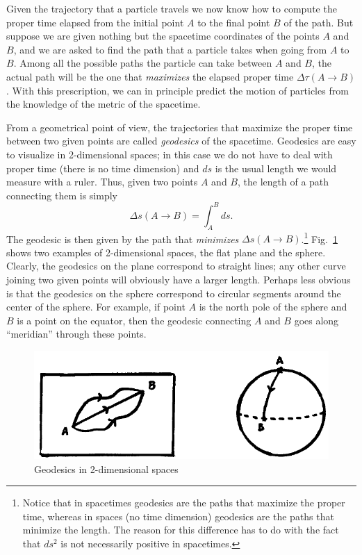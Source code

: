 Given the trajectory that a particle travels we now know how to compute the proper time elapsed from the initial point $A$ to the final point $B$ of the path. But suppose we are given nothing but the spacetime coordinates of the points $A$ and $B$, and we are asked to find the path that a particle takes when going from $A$ to $B$. Among all the possible paths the particle can take between $A$ and $B$, the actual path will be the one that {\it maximizes} the elapsed proper time $\Delta\tau(A\to B)$. With this prescription, we can in principle predict the motion of particles from the knowledge of the metric of the spacetime.

From a geometrical point of view, the trajectories that maximize the proper time between two given points are called {\it geodesics} of the spacetime. Geodesics are easy to visualize in 2-dimensional spaces; in this case we do not have to deal with proper time (there is no time dimension) and $ds$ is the usual length we would measure with a ruler. Thus, given two points $A$ and $B$, the length of a path connecting them is simply
\begin{equation}
\Delta s(A\to B)=\int_A^B ds.
\end{equation}
The geodesic is then given by the path that {\it minimizes} $\Delta s(A\to B)$.\footnote{Notice that in spacetimes geodesics are the paths that maximize the proper time, whereas in spaces (no time dimension) geodesics are the paths that minimize the length. The reason for this difference has to do with the fact that $ds^2$ is not necessarily positive in spacetimes.} Fig.\ \ref{fig:lec4_1} shows two examples of 2-dimensional spaces, the flat plane and the sphere. Clearly, the geodesics on the plane correspond to straight lines; any other curve joining two given points will obviously have a larger length. Perhaps less obvious is that the geodesics on the sphere correspond to circular segments around the center of the sphere. For example, if point $A$ is the north pole of the sphere and $B$ is a point on the equator, then the geodesic connecting $A$ and $B$ goes along ``meridian'' through these points.
\begin{figure}[ht]
\begin{center}
\includegraphics[scale=0.5]{Draw/lec4_1.png}
\end{center}
\caption{Geodesics in 2-dimensional spaces}
\label{fig:lec4_1}
\end{figure}


